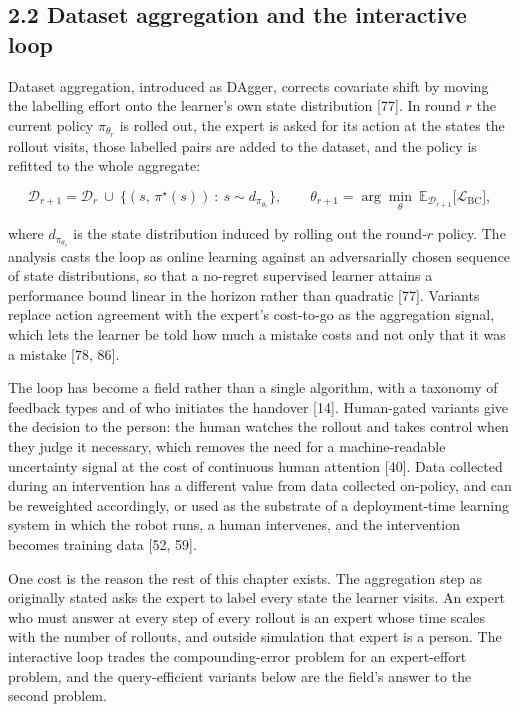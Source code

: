 \documentclass[
  11pt,
]{article}
\begin{document}
\hypertarget{dataset-aggregation-and-the-interactive-loop}{%
\subsection{2.2 Dataset aggregation and the interactive
loop}\label{dataset-aggregation-and-the-interactive-loop}}

Dataset aggregation, introduced as DAgger, corrects covariate shift by
moving the labelling effort onto the learner's own state distribution
{[}77{]}. In round \(r\) the current policy \(\pi_{\theta_r}\) is rolled
out, the expert is asked for its action at the states the rollout
visits, those labelled pairs are added to the dataset, and the policy is
refitted to the whole aggregate:

\[\mathcal{D}_{r+1} = \mathcal{D}_r \ \cup\ \big\{ (s,\, \pi^\star(s)) \ : \ s \sim d_{\pi_{\theta_r}} \big\},
\qquad
\theta_{r+1} = \arg\min_\theta \ \mathbb{E}_{\mathcal{D}_{r+1}} \big[ \mathcal{L}_{\mathrm{BC}} \big],\]

where \(d_{\pi_{\theta_r}}\) is the state distribution induced by
rolling out the round-\(r\) policy. The analysis casts the loop as
online learning against an adversarially chosen sequence of state
distributions, so that a no-regret supervised learner attains a
performance bound linear in the horizon rather than quadratic {[}77{]}.
Variants replace action agreement with the expert's cost-to-go as the
aggregation signal, which lets the learner be told how much a mistake
costs and not only that it was a mistake {[}78, 86{]}.

The loop has become a field rather than a single algorithm, with a
taxonomy of feedback types and of who initiates the handover {[}14{]}.
Human-gated variants give the decision to the person: the human watches
the rollout and takes control when they judge it necessary, which
removes the need for a machine-readable uncertainty signal at the cost
of continuous human attention {[}40{]}. Data collected during an
intervention has a different value from data collected on-policy, and
can be reweighted accordingly, or used as the substrate of a
deployment-time learning system in which the robot runs, a human
intervenes, and the intervention becomes training data {[}52, 59{]}.

One cost is the reason the rest of this chapter exists. The aggregation
step as originally stated asks the expert to label every state the
learner visits. An expert who must answer at every step of every rollout
is an expert whose time scales with the number of rollouts, and outside
simulation that expert is a person. The interactive loop trades the
compounding-error problem for an expert-effort problem, and the
query-efficient variants below are the field's answer to the second
problem.
\end{document}
